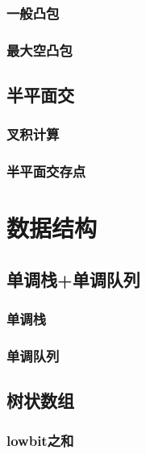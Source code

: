 \documentclass{article}
\begin{document}
\subsubsection{一般凸包}

\subsubsection{最大空凸包}


\subsection{半平面交}
\subsubsection{叉积计算}

\subsubsection{半平面交存点}


\section{数据结构}

\subsection{﻿单调栈+单调队列}
\subsubsection{单调栈}

\subsubsection{单调队列}


\subsection{树状数组}
\subsubsection{lowbit之和}

\end{document}

